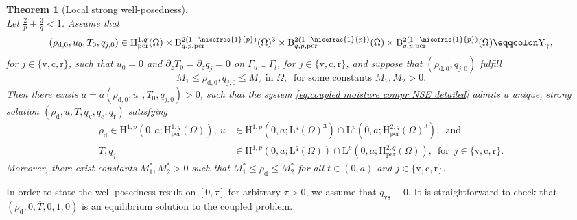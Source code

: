 \documentclass[10pt]{amsart}
\theoremstyle{plain}
\newtheorem{thm}{Theorem}[section]
\theoremstyle{definition}
\theoremstyle{thm}
\numberwithin{equation}{section}
\newcommand{\rL}{\mathrm{L}}
\newcommand{\rLq}{\rL^q}
\newcommand{\rLp}{\rL^p}
\newcommand{\rH}{\mathrm{H}}
\newcommand{\rB}{\mathrm{B}}
\newcommand{\rY}{\mathrm{Y}}
\newcommand{\del}{\partial}
\newcommand{\per}{\mathrm{per}}
\newcommand{\dz}{\del_z}
\newcommand{\Gal}{\Gamma_l}
\newcommand{\Gau}{\Gamma_u}
\newcommand{\tand}{\enspace \text{and} \enspace}
\newcommand{\tfor}{\enspace \text{for} \enspace}
\newcommand{\rd}{\mathrm{d}}
\newcommand{\rr}{\mathrm{r}}
\newcommand{\rv}{\mathrm{v}}
\newcommand{\rvs}{\mathrm{vs}}
\newcommand{\rc}{\mathrm{c}}
\begin{document}
\begin{thm}[Local strong well-posedness]  \mbox{} \\
    \label{thm:localWP}
    Let $\frac{2}{p}+\frac{3}{q}<1$.
    Assume that 
    \begin{equation*}
        \begin{aligned}
            (\rho_{\rd,0},u_0, T_0, q_{j,0}) \in \rH^{1,q}_\per(\Omega) \times  \rB_{q,p,\per}^{2(1-\nicefrac{1}{p})}(\Omega)^3 \times \rB_{q,p,\per}^{2(1-\nicefrac{1}{p})}(\Omega) \times \rB_{q,p,\per}^{2(1-\nicefrac{1}{p})}(\Omega) \eqqcolon \rY_\gamma, 
        \end{aligned}
    \end{equation*}
    for $j\in \{ \rv,\rc,\rr\}$, such that $u_0 = 0$ and $\dz T_0 = \dz q_j = 0$ on $\Gau \cup \Gal$, for $j \in \{\rv,\rc,\rr\}$, and suppose that $(\rho_{\rd,0},q_{j,0})$ fulfill
    \begin{equation*}
        M_1\leq \rho_{\rd,0},q_{j,0}\leq M_2 \text{ in }\Omega, \ \text{ for some constants }M_1,M_2>0.
    \end{equation*}
Then there exists $a = a(\rho_{\rd,0},u_0, T_0, q_{j,0}) > 0$, such that the system \eqref{eq:coupled moisture compr NSE detailed} admits a unique, strong solution $(\rho_{\rd},u,T,q_\rv,q_\rc,q_\rr)$ satisfying
  \begin{equation*}
        \begin{aligned}
            \rho_{\rd} \in \rH^{1,p}(0,a;\rH^{1,q}_\per(\Omega)), \ u 
            &\in \rH^{1,p}(0,a;\rLq(\Omega)^3) \cap \rLp(0,a;\rH^{2,q}_\per(\Omega)^3), \tand \\ T,q_j 
            &\in \rH^{1,p}(0,a;\rLq(\Omega)) \cap \rLp(0,a;\rH^{2,q}_\per(\Omega)), \tfor j \in \{ \rv,\rc,\rr\}.
        \end{aligned}
    \end{equation*}
    Moreover, there exist constants $M_1^*,M_2^*>0$ such that $M_1^*\leq \rho_{\rd}\leq M_2^*$ for all $t \in (0,a)$ and $j \in \{ \rv,\rc,\rr\}$.
\end{thm}

In order to state the well-posedness result on $[0,\tau]$ for arbitrary $\tau > 0$, we assume that $q_\rvs \equiv 0$. 
It is straightforward to check that $(\overline{\rho}_\rd, 0, \overline{T}, 0, 1, 0 )$ is an equilibrium solution to the coupled problem.
\end{document}
